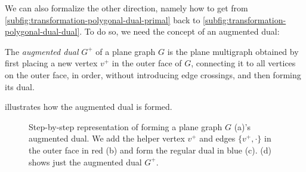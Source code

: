 We can also formalize the other direction, namely how to get from \cref{subfig:transformation-polygonal-dual-primal} back to \cref{subfig:transformation-polygonal-dual-dual}. To do so, we need the concept of an augmented dual:
%
\begin{definition}
	The \emph{augmented dual} $G^+$ of a plane graph $G$ is the plane multigraph obtained by first placing a new vertex $v^+$ in the outer face of $G$, connecting it to all vertices on the outer face, in order, without introducing edge crossings, and then forming its dual.
	\label{def:augmented-dual}
\end{definition}

 illustrates how the augmented dual is formed.
%
\begin{figure}[H]
	\centering
	\quad
	\quad
	\quad
	\caption{Step-by-step representation of forming a plane graph $G$ (a)'s augmented dual. We add the helper vertex $v^+$ and edges $\{v^+,\cdot\}$ in the outer face in red (b) and form the regular dual in blue (c). (d) shows just the augmented dual $G^+$.}
	\label{fig:transformation-augmented-dual}
\end{figure}

